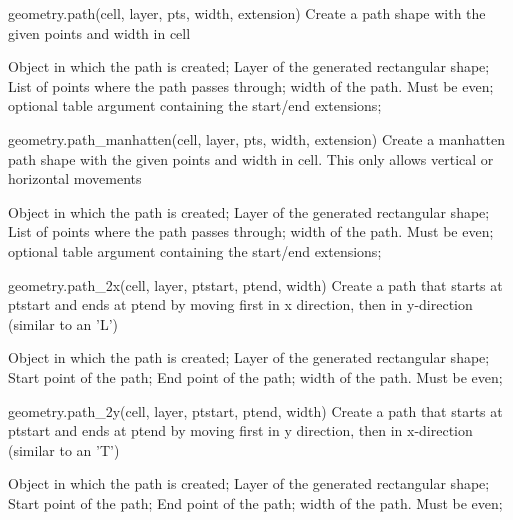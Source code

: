 \begin{APIfunc}{geometry.path(cell, layer, pts, width, extension)}
    Create a path shape with the given points and width in cell
    \begin{APIparameters}
            Object in which the path is created;
            Layer of the generated rectangular shape;
            List of points where the path passes through;
            width of the path. Must be even;
            optional table argument containing the start/end extensions;
    \end{APIparameters}
\end{APIfunc}
\begin{APIfunc}{geometry.path\_manhatten(cell, layer, pts, width, extension)}
    Create a manhatten path shape with the given points and width in cell. This only allows vertical or horizontal movements
    \begin{APIparameters}
            Object in which the path is created;
            Layer of the generated rectangular shape;
            List of points where the path passes through;
            width of the path. Must be even;
            optional table argument containing the start/end extensions;
    \end{APIparameters}
\end{APIfunc}
\begin{APIfunc}{geometry.path\_2x(cell, layer, ptstart, ptend, width)}
    Create a path that starts at ptstart and ends at ptend by moving first in x direction, then in y-direction (similar to an 'L')
    \begin{APIparameters}
            Object in which the path is created;
            Layer of the generated rectangular shape;
            Start point of the path;
            End point of the path;
            width of the path. Must be even;
    \end{APIparameters}
\end{APIfunc}
\begin{APIfunc}{geometry.path\_2y(cell, layer, ptstart, ptend, width)}
    Create a path that starts at ptstart and ends at ptend by moving first in y direction, then in x-direction (similar to an 'T')
    \begin{APIparameters}
            Object in which the path is created;
            Layer of the generated rectangular shape;
            Start point of the path;
            End point of the path;
            width of the path. Must be even;
    \end{APIparameters}
\end{APIfunc}
